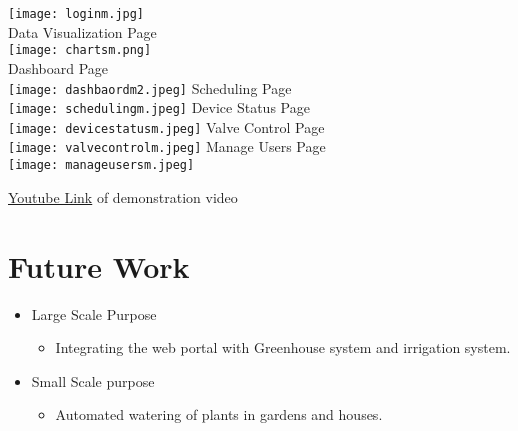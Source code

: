 \documentclass[a4paper,12pt,oneside]{book}
\begin{document}
\begin{enumerate}
\begin{itemize}
\texttt{[image: loginm.jpg]}\\
\newpage
Data Visualization Page\\

\texttt{[image: chartsm.png]}\\
\newpage
Dashboard Page\\

\texttt{[image: dashbaordm2.jpeg]}
\newpage
Scheduling Page\\

\texttt{[image: schedulingm.jpeg]}
\newpage
Device Status Page\\

\texttt{[image: devicestatusm.jpeg]}
\newpage
Valve Control Page\\

\texttt{[image: valvecontrolm.jpeg]}
\newpage
Manage Users Page\\

\texttt{[image: manageusersm.jpeg]}
\newpage


\end{itemize}
 


\href{https://youtu.be/fZxgUEiySDY}{Youtube Link} of demonstration video 

\section{Future Work}
\begin{itemize}
\item{Large Scale Purpose}
\begin{itemize}
\item{Integrating the web portal with Greenhouse system and irrigation system.}
\end{itemize}
\item{Small Scale purpose}
\begin{itemize}
\item{{Automated watering of plants in gardens and houses.}}
\end{itemize}
\end{itemize}



\end{enumerate}
\end{document}
